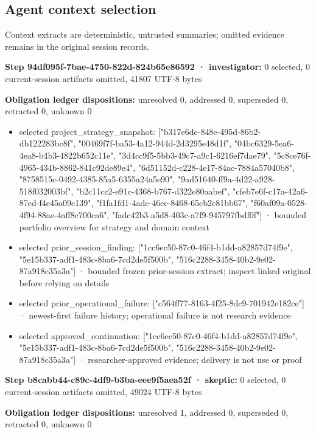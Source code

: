 \documentclass[11pt]{article}
\begin{document}
\subsection{Agent context selection}
Context extracts are deterministic, untrusted summaries; omitted evidence remains in the original session records.\par
\textbf{Step 94df095f-7bae-4750-822d-824b65e86592 · investigator:} 0 selected, 0 current-session artifacts omitted, 41807 UTF-8 bytes\par
\textbf{Obligation ledger dispositions:} unresolved 0, addressed 0, superseded 0, retracted 0, unknown 0\par
\begin{itemize}
\item selected project\_strategy\_snapshot: ["b317e6de-848e-495d-86b2-db122283bc8f", "00469f7f-ba53-4a12-944d-2d3295e48d1f", "04bc6329-5ea6-4ea8-b4b3-4822b652c11e", "3d4cc9f5-5bb3-49c7-a9c1-6216ef7dae79", "5c8ce76f-4965-434b-8862-841c92de89e4", "6d51152d-c228-4e17-84ac-7884a57040b8", "8758515c-0492-4385-85a5-6355a24a5e90", "9ad51640-ff9a-4d22-a928-518f032003bf", "b2c11cc2-e91c-4368-b767-d322e80aabef", "cfeb7e6f-c17a-42a6-87ed-f4e45a09c139", "f1fa1fd1-4adc-46cc-8468-65cb2c81bb67", "f60af09a-0528-4f94-88ae-4aff8c700ca6", "fadc42b3-a5d8-403c-a7f9-945797fbdf0f"] · bounded portfolio overview for strategy and domain context
\item selected prior\_session\_finding: ["1cc6ec50-87c0-46f4-b1dd-a82857d74f9e", "5e15b337-adf1-483c-8ba6-7cd2de5f500b", "516c2288-3458-40b2-9e02-87a918c35a3a"] · bounded frozen prior-session extract; inspect linked original before relying on details
\item selected prior\_operational\_failure: ["c564ff77-8163-4f25-8dc9-701942e182ce"] · newest-first failure history; operational failure is not research evidence
\item selected approved\_continuation: ["1cc6ec50-87c0-46f4-b1dd-a82857d74f9e", "5e15b337-adf1-483c-8ba6-7cd2de5f500b", "516c2288-3458-40b2-9e02-87a918c35a3a"] · researcher-approved evidence; delivery is not use or proof
\end{itemize}
\textbf{Step b8cabb44-c89c-4df9-b3ba-eee9f5aea52f · skeptic:} 0 selected, 0 current-session artifacts omitted, 49024 UTF-8 bytes\par
\textbf{Obligation ledger dispositions:} unresolved 1, addressed 0, superseded 0, retracted 0, unknown 0\par
\end{document}
